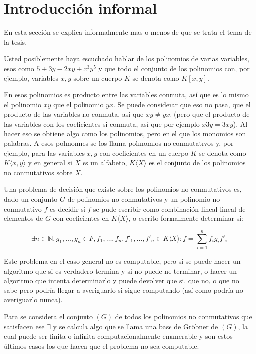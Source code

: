 \documentclass{amsbook} %
\theoremstyle{customstyle}
\theoremstyle{factstyle}
\begin{document}
\fontsize{16pt}{19pt}\selectfont %

\chapter{Introducción informal}

En esta sección se explica informalmente mas o menos de que se trata el tema de la tesis.

Usted posiblemente haya escuchado hablar de los polinomios de varias variables, esos como $5  + 3 y - 2 x y + x^3 y^5$ y que todo el conjunto de los polinomios con, por ejemplo, variables $x, y$ sobre un cuerpo $K$ se denota como $K[x, y]$.

En esos polinomios es producto entre las variables conmuta, así que es lo mismo el polinomio $x y$ que el polinomio $y x$. Se puede considerar que eso no pasa, que el producto de las variables no conmuta, así que $x y ≠ y x$, (pero que el producto de las variables con los coeficientes si conmuta, así que por ejemplo $x 3 y = 3 x y$). Al hacer eso se obtiene algo como los polinomios, pero en el que los monomios son palabras. A esos polinomios se los llama polinomios no conmutativos y, por ejemplo, para las variables $x, y$ con coeficientes en un cuerpo $K$ se denota como $K⟨x, y⟩$ y en general si $X$ es un alfabeto, $K⟨X⟩$ es el conjunto de los polinomios no conmutativos sobre $X$.

Una problema de decisión que existe sobre los polinomios no conmutativos es, dado un conjunto $G$ de polinomios no conmutativos y un polinomio no conmutativo $f$ es decidir si $f$ se pude escribir como combinación lineal lineal de elementos de $G$ con coeficientes en $K⟨X⟩$, o escrito formalmente determinar si:

\[ ∃n ∈ ℕ, g_1, …, g_n ∈ F, f_1, …, f_n, f'_1, …, f'_n ∈ K⟨X⟩ : f = ∑_{i = 1}^n f_i g_i f'_i \]

Este problema en el caso general no es computable, pero si se puede hacer un algoritmo que si es verdadero termina y si no puede no terminar, o hacer un algoritmo que intenta determinarlo y puede devolver que si, que no, o que no sabe pero podría llegar a averiguarlo si sigue computando (así como podría no averiguarlo nunca).

Para se considera el conjunto $(G)$ de todos los polinomios no conmutativos que satisfacen ese $∃$ y se calcula algo que se llama una base de Gröbner de $(G)$, la cual puede ser finita o infinita computacionalmente enumerable y son estos últimos casos los que hacen que el problema no sea computable.
\end{document}
